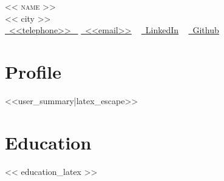 \documentclass[letterpaper,11pt]{article}
\makeatletter
\newcommand{\resumeSubheading}[4]{
  \vspace{-2pt}\item
    \begin{tabular*}{1.0\textwidth}[t]{l@{\extracolsep{\fill}}r}
      \textbf{\large#1} & \textbf{\small #2} \\
      \textit{\large#3} & \textit{\small #4} \\
     
    \end{tabular*}\vspace{-7pt}
}
\newcommand{\resumeSubHeadingListStart}{\begin{itemize}[leftmargin=0.0in, label={}]}
\newcommand{\resumeSubHeadingListEnd}{\end{itemize}}
\makeatother
\begin{document}

\begin{center}
    {\Huge \scshape << name >>} \\ \vspace{1pt}
    << city >> \\ \vspace{1pt}
    \small 
    \small \href{<<telephone>>}{ \raisebox{-0.1\height}\faPhone\ \underline{<<telephone>>} ~} 
    \href{<<email>>}{\raisebox{-0.2\height}\faEnvelope\  \underline{<<email>>}} ~
    \href{<<linkedin>>}{\raisebox{-0.2\height}\faLinkedinSquare\ \underline{LinkedIn}}  ~
    \href{<<github>>}{\raisebox{-0.2\height}\faGithub\ \underline{Github}} ~
\end{center}

\section{Profile}
<<user_summary|latex_escape>>



\section*{Education}
<< education_latex >>


\end{document}
